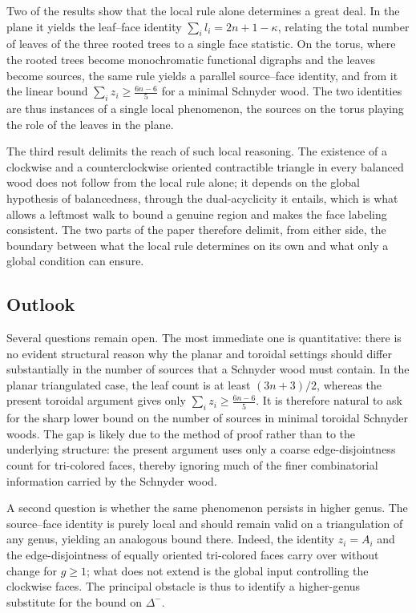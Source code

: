 \documentclass[11pt]{amsart}
\theoremstyle{plain}
\theoremstyle{definition}
\theoremstyle{remark}
\begin{document}
Two of the results show that the local rule alone determines a great deal. In the plane it yields the leaf--face identity $\sum_{i} l_i = 2n + 1 - \kappa$, relating the total number of leaves of the three rooted trees to a single face statistic. On the torus, where the rooted trees become monochromatic functional digraphs and the leaves become sources, the same rule yields a parallel source--face identity, and from it the linear bound $\sum_i z_i \geq \frac{6n-6}{5}$ for a minimal Schnyder wood. The two identities are thus instances of a single local phenomenon, the sources on the torus playing the role of the leaves in the plane.

The third result delimits the reach of such local reasoning. The existence of a clockwise and a counterclockwise oriented contractible triangle in every balanced wood does not follow from the local rule alone; it depends on the global hypothesis of balancedness, through the dual-acyclicity it entails, which is what allows a leftmost walk to bound a genuine region and makes the face labeling consistent. The two parts of the paper therefore delimit, from either side, the boundary between what the local rule determines on its own and what only a global condition can ensure.

\subsection*{Outlook}
Several questions remain open. The most immediate one is quantitative: there is no evident structural reason why the planar and toroidal settings should differ substantially in the number of sources that a Schnyder wood must contain. In the planar triangulated case, the leaf count is at least \((3n+3)/2\), whereas the present toroidal argument gives only
\(
\sum_i z_i \geq \frac{6n-6}{5}.
\)
It is therefore natural to ask for the sharp lower bound on the number of sources in minimal toroidal Schnyder woods. The gap is likely due to the method of proof rather than to the underlying structure: the present argument uses only a coarse edge-disjointness count for tri-colored faces, thereby ignoring much of the finer combinatorial information carried by the Schnyder wood.

A second question is whether the same phenomenon persists in higher genus. The source--face identity is purely local and should remain valid on a triangulation of any genus, yielding an analogous bound there. Indeed, the identity $z_i = A_i$ and the edge-disjointness of equally oriented tri-colored faces carry over without change for $g \geq 1$; what does not extend is the global input controlling the clockwise faces. The principal obstacle is thus to identify a higher-genus substitute for the bound on $\Delta^-$.
\end{document}
